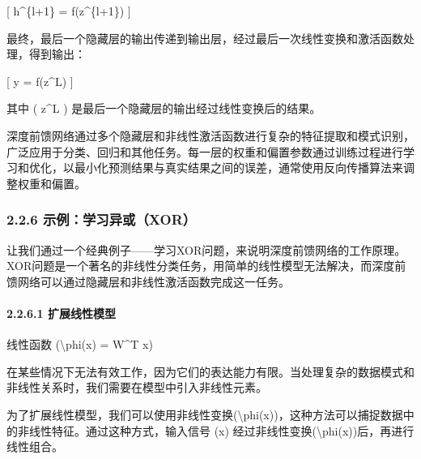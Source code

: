 {[} h\^{}\{l+1\} = f(z\^{}\{l+1\}) {]}


最终，最后一个隐藏层的输出传递到输出层，经过最后一次线性变换和激活函数处理，得到输出：

{[} y = f(z\^{}L) {]}


其中 ( z\^{}L ) 是最后一个隐藏层的输出经过线性变换后的结果。

深度前馈网络通过多个隐藏层和非线性激活函数进行复杂的特征提取和模式识别，广泛应用于分类、回归和其他任务。每一层的权重和偏置参数通过训练过程进行学习和优化，以最小化预测结果与真实结果之间的误差，通常使用反向传播算法来调整权重和偏置。

\subsubsection{\texorpdfstring{\textbf{2.2.6}
\textbf{示例：学习异或（XOR）}}{2.2.6 示例：学习异或（XOR）}}\label{226-ux793aux4f8bux5b66ux4e60ux5f02ux6216xor}

让我们通过一个经典例子------学习XOR问题，来说明深度前馈网络的工作原理。XOR问题是一个著名的非线性分类任务，用简单的线性模型无法解决，而深度前馈网络可以通过隐藏层和非线性激活函数完成这一任务。

\paragraph{\texorpdfstring{\textbf{2.2.6.1}
\textbf{扩展线性模型}}{2.2.6.1 扩展线性模型}}\label{2261-ux6269ux5c55ux7ebfux6027ux6a21ux578b}

线性函数 (\textbackslash phi(x) = W\^{}T x)


在某些情况下无法有效工作，因为它们的表达能力有限。当处理复杂的数据模式和非线性关系时，我们需要在模型中引入非线性元素。

为了扩展线性模型，我们可以使用非线性变换(\textbackslash phi(x))，这种方法可以捕捉数据中的非线性特征。通过这种方式，输入信号
(x) 经过非线性变换(\textbackslash phi(x))后，再进行线性组合。

